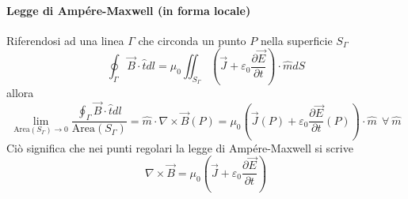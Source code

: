 \paragraph{Legge di Ampére-Maxwell (in forma locale)}
Riferendosi ad una linea $\Gamma$ che circonda un punto $P$ nella superficie $S_\Gamma$
$$
\oint_\Gamma\vec{B}\cdot\hat{t}dl = \mu_0 \iint_{S_\Gamma} \left(\vec{J}+\varepsilon_0\frac{\partial \vec{E}}{\partial t}\right)\cdot \hat{m} dS
$$
allora
$$
\lim_{\text{Area}(S_\Gamma)\to 0} \frac{\oint_\Gamma \vec{B}\cdot\hat{t}dl}{\text{Area}(S_\Gamma)} =
\hat{m}\cdot\nabla\times\vec{B}(P) = \mu_0 \left(\vec{J}(P)+\varepsilon_0\frac{\partial\vec{E}}{\partial t}(P)\right)\cdot\hat{m}\ \ \forall\ \hat{m}
$$
Ciò significa che nei punti regolari la legge di Ampére-Maxwell si scrive
\begin{equation}
 \nabla\times\vec{B} = \mu_0\left(\vec{J}+\varepsilon_0\frac{\partial\vec{E}}{\partial t}\right)
\end{equation}

